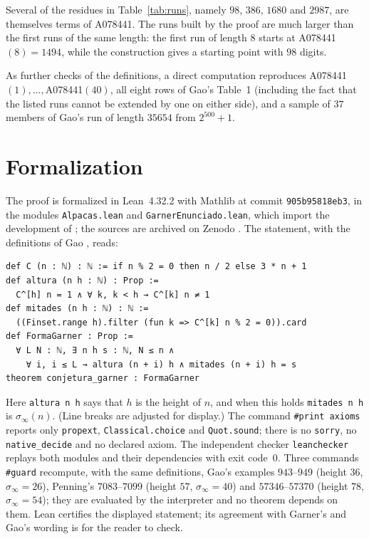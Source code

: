 \documentclass[11pt]{amsart}
\theoremstyle{definition}
\theoremstyle{remark}
\newcommand{\lean}[1]{\nolinkurl{#1}}
\begin{document}
Several of the residues in Table~\ref{tab:runs}, namely $98$, $386$, $1680$ and $2987$, are themselves terms of A078441. The runs built by the proof are much larger than the first runs of the same length: the first run of length $8$ starts at A078441$(8)=1494$, while the construction gives a starting point with $98$ digits.

As further checks of the definitions, a direct computation reproduces A078441$(1),\dots,$A078441$(40)$, all eight rows of Gao's Table~1 (including the fact that the listed runs cannot be extended by one on either side), and a sample of $37$ members of Gao's run of length $35654$ from $2^{500}+1$.

\section{Formalization}\label{sec:formal}

The proof is formalized in Lean~4.32.2 with Mathlib at commit \lean{905b95818eb3}, in the modules \lean{Alpacas.lean} and \lean{GarnerEnunciado.lean}, which import the development of \cite{SaidGao}; the sources are archived on Zenodo \cite{Artifact}. The statement, with the definitions of Gao \cite[p.~262]{Gao93}, reads:

\begin{Verbatim}[fontsize=\small]
def C (n : ℕ) : ℕ := if n % 2 = 0 then n / 2 else 3 * n + 1
def altura (n h : ℕ) : Prop :=
  C^[h] n = 1 ∧ ∀ k, k < h → C^[k] n ≠ 1
def mitades (n h : ℕ) : ℕ :=
  ((Finset.range h).filter (fun k => C^[k] n % 2 = 0)).card
def FormaGarner : Prop :=
  ∀ L N : ℕ, ∃ n h s : ℕ, N ≤ n ∧
    ∀ i, i ≤ L → altura (n + i) h ∧ mitades (n + i) h = s
theorem conjetura_garner : FormaGarner
\end{Verbatim}

\noindent Here \texttt{altura n h} says that $h$ is the height of $n$, and when this holds \texttt{mitades n h} is $\sigma_\infty(n)$. (Line breaks are adjusted for display.) The command \texttt{\#print axioms} reports only \texttt{propext}, \texttt{Classical.choice} and \texttt{Quot.sound}; there is no \texttt{sorry}, no \lean{native_decide} and no declared axiom. The independent checker \texttt{leanchecker} replays both modules and their dependencies with exit code~$0$. Three commands \texttt{\#guard} recompute, with the same definitions, Gao's examples $943$--$949$ (height $36$, $\sigma_\infty=26$), Penning's $7083$--$7099$ (height $57$, $\sigma_\infty=40$) and $57346$--$57370$ (height $78$, $\sigma_\infty=54$); they are evaluated by the interpreter and no theorem depends on them. Lean certifies the displayed statement; its agreement with Garner's and Gao's wording is for the reader to check.
\end{document}

